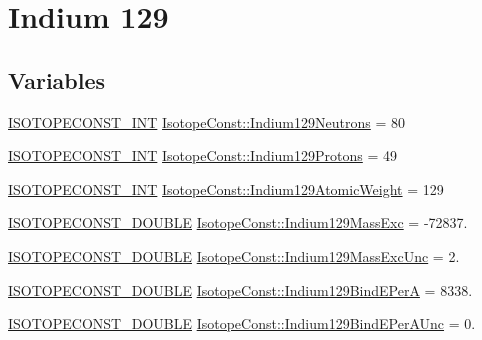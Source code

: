 \hypertarget{group___isotope_const-_indium-_in129}{}\section{Indium 129}
\label{group___isotope_const-_indium-_in129}
\subsection*{Variables}
\begin{DoxyCompactItemize}
\item 
\mbox{\hyperlink{group___isotope_const-_macros_ga5f18360b3e99483a35c32d789e62621c}{I\+S\+O\+T\+O\+P\+E\+C\+O\+N\+S\+T\+\_\+\+I\+NT}} \mbox{\hyperlink{group___isotope_const-_indium-_in129_gabe68960e5344a8f26037a8ddcf7764d1}{Isotope\+Const\+::\+Indium129\+Neutrons}} = 80
\item 
\mbox{\hyperlink{group___isotope_const-_macros_ga5f18360b3e99483a35c32d789e62621c}{I\+S\+O\+T\+O\+P\+E\+C\+O\+N\+S\+T\+\_\+\+I\+NT}} \mbox{\hyperlink{group___isotope_const-_indium-_in129_gae0d5ba22e44ec1dd7aa3e7beb42878d5}{Isotope\+Const\+::\+Indium129\+Protons}} = 49
\item 
\mbox{\hyperlink{group___isotope_const-_macros_ga5f18360b3e99483a35c32d789e62621c}{I\+S\+O\+T\+O\+P\+E\+C\+O\+N\+S\+T\+\_\+\+I\+NT}} \mbox{\hyperlink{group___isotope_const-_indium-_in129_ga9783db0affa75460433a8f1a1b0705be}{Isotope\+Const\+::\+Indium129\+Atomic\+Weight}} = 129
\item 
\mbox{\hyperlink{group___isotope_const-_macros_ga8f45a7272ce02c0b4c65c44636ed719a}{I\+S\+O\+T\+O\+P\+E\+C\+O\+N\+S\+T\+\_\+\+D\+O\+U\+B\+LE}} \mbox{\hyperlink{group___isotope_const-_indium-_in129_gab0c3c16902ff0d885c91074a89e5dbc2}{Isotope\+Const\+::\+Indium129\+Mass\+Exc}} = -\/72837.
\item 
\mbox{\hyperlink{group___isotope_const-_macros_ga8f45a7272ce02c0b4c65c44636ed719a}{I\+S\+O\+T\+O\+P\+E\+C\+O\+N\+S\+T\+\_\+\+D\+O\+U\+B\+LE}} \mbox{\hyperlink{group___isotope_const-_indium-_in129_ga8ed2ad362e751915d6dd349197967361}{Isotope\+Const\+::\+Indium129\+Mass\+Exc\+Unc}} = 2.
\item 
\mbox{\hyperlink{group___isotope_const-_macros_ga8f45a7272ce02c0b4c65c44636ed719a}{I\+S\+O\+T\+O\+P\+E\+C\+O\+N\+S\+T\+\_\+\+D\+O\+U\+B\+LE}} \mbox{\hyperlink{group___isotope_const-_indium-_in129_ga070ba1940e3bc4f12dda96caacda0dbd}{Isotope\+Const\+::\+Indium129\+Bind\+E\+PerA}} = 8338.
\item 
\mbox{\hyperlink{group___isotope_const-_macros_ga8f45a7272ce02c0b4c65c44636ed719a}{I\+S\+O\+T\+O\+P\+E\+C\+O\+N\+S\+T\+\_\+\+D\+O\+U\+B\+LE}} \mbox{\hyperlink{group___isotope_const-_indium-_in129_ga06c743ead7ac55ab7ec5acd53006394c}{Isotope\+Const\+::\+Indium129\+Bind\+E\+Per\+A\+Unc}} = 0.

\end{DoxyCompactItemize}

